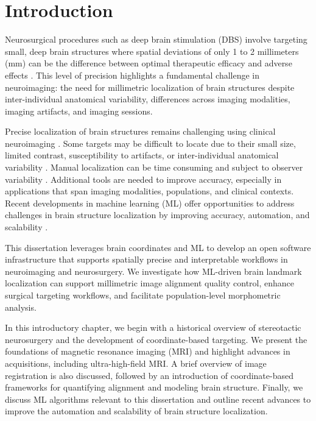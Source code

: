 \chapter{Introduction}\label{chap:intro}
\newpage
\sloppy
\noindent 
Neurosurgical procedures such as deep brain stimulation (DBS) involve targeting small, deep brain structures where spatial deviations of only 1 to 2 millimeters (mm) can be the difference between optimal therapeutic efficacy and adverse effects \cite{Horn2018-qq}. This level of precision highlights a fundamental challenge in neuroimaging: the need for millimetric localization of brain structures despite inter-individual anatomical variability, differences across imaging modalities, imaging artifacts, and imaging sessions.

Precise localization of brain structures remains challenging using clinical neuroimaging \cite{Boutet2021-vg}. Some targets may be difficult to locate due to their small size, limited contrast, susceptibility to artifacts, or inter-individual anatomical variability \cite{Lau2020-dh}. Manual localization can be time consuming and subject to observer variability \cite{Miller2023-ct}. Additional tools are needed to improve accuracy, especially in applications that span imaging modalities, populations, and clinical contexts. Recent developments in machine learning (ML) offer opportunities to address challenges in brain structure localization by improving accuracy, automation, and scalability \cite{Andrews2025-kd}.

This dissertation leverages brain coordinates and ML to develop an open software infrastructure that supports spatially precise and interpretable workflows in neuroimaging and neurosurgery. We investigate how ML-driven brain landmark localization can support millimetric image alignment quality control, enhance surgical targeting workflows, and facilitate population-level morphometric analysis.

In this introductory chapter, we begin with a historical overview of stereotactic neurosurgery and the development of coordinate-based targeting. We present the foundations of magnetic resonance imaging (MRI) and highlight advances in acquisitions, including ultra-high-field MRI. A brief overview of image registration is also discussed, followed by an introduction of coordinate-based frameworks for quantifying alignment and modeling brain structure. Finally, we discuss ML algorithms relevant to this dissertation and outline recent advances to improve the automation and scalability of brain structure localization.

